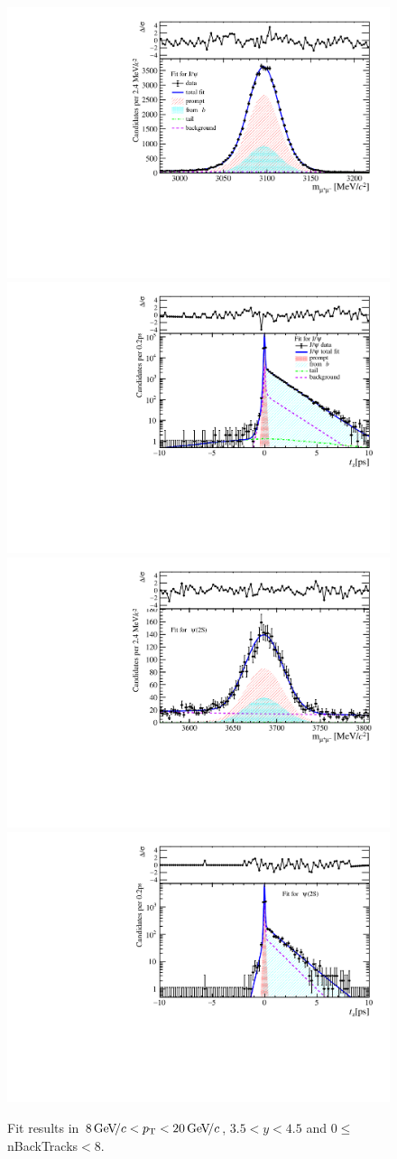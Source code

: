 \begin{figure}[H]
\begin{center}
\includegraphics[width=0.47\linewidth]{pdf/Jpsi/drawmassB/n1y3pt5.pdf}
\includegraphics[width=0.47\linewidth]{pdf/Jpsi/2DFitB/n1y3pt5.pdf}
\vspace*{-0.5cm}
\includegraphics[width=0.47\linewidth]{pdf/Psi2S/drawmassB/n1y3pt5.pdf}
\includegraphics[width=0.47\linewidth]{pdf/Psi2S/2DFitB/n1y3pt5.pdf}
\vspace*{-0.5cm}
\end{center}
\caption{Fit results in $8\text{\,Ge\kern -0.1em V\!/}c<p_{\mathrm{T}}<20\text{\,Ge\kern -0.1em V\!/}c$, $3.5<y<4.5$ and 0$\leq$nBackTracks$<$8.}
\label{Fitn1y3pt5}
\end{figure}
